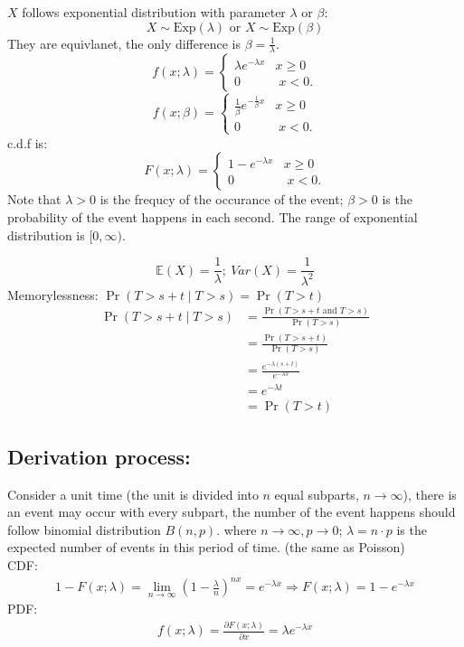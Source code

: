 \documentclass[11pt]{elegantbook}
\begin{document}
$X$ follows exponential distribution with parameter $\lambda$ or $\beta$:
$${\displaystyle X\sim {\text{Exp}}(\lambda )} \text{ or } {\displaystyle X\sim {\text{Exp}}(\beta )}$$
They are equivlanet, the only difference is $\beta=\frac{1}{\lambda}$.
$${f(x;{\lambda})=\left\{{\begin{matrix}{\lambda }e^{-{\lambda }x}&x\geq 0\\0&\;x<0.\end{matrix}}\right.}$$
$${f(x;{\beta})=\left\{{\begin{matrix}{\frac{1}{\beta} }e^{-{\frac{1}{\beta} }x}&x\geq 0\\0&\;x<0.\end{matrix}}\right.}$$
c.d.f is:
$${F(x;{\lambda})=\left\{{\begin{matrix}{1-}e^{-{\lambda }x}&x\geq 0\\0&\;x<0.\end{matrix}}\right.}$$
Note that $\lambda > 0$ is the frequcy of the occurance of the event; $\beta>0$ is the probability of the event happens in each second. The range of exponential distribution is $[0,\infty)$.

$$\mathbb{E}(X)=\frac{1}{\lambda};\ Var(X)=\frac{1}{\lambda^2}$$
Memorylessness: ${\displaystyle \Pr \left(T>s+t\mid T>s\right)=\Pr(T>t)}$
\begin{equation}
    \begin{aligned}
        \Pr (T>s+t\mid T>s)&=\frac{\Pr(T>s+t\text{ and }T>s)}{\Pr(T>s)}\\
        &=\frac{\Pr(T>s+t)}{\Pr(T>s)}\\
        &=\frac{e^{-\lambda(s+t)}}{e^{-\lambda s}}\\
        &=e^{-\lambda t}\\
        &=\Pr (T>t)
    \end{aligned}
    \nonumber
\end{equation}

\subsection*{Derivation process:}

Consider a unit time (the unit is divided into $n$ equal subparts, $n \rightarrow \infty$), there is an event may occur with every subpart, the number of the event happens should follow binomial distribution $B(n,p)$. where $n \rightarrow \infty, p \rightarrow 0$; $\lambda=n\cdot p$ is the expected number of events in this period of time. (the same as Poisson)\\
CDF:
\begin{equation}
    \begin{aligned}
        1-F(x;\lambda)=\lim_{n \rightarrow \infty}(1-\frac{\lambda}{n})^{nx}=e^{-\lambda x}
        \Rightarrow F(x;\lambda)=1-e^{-\lambda x}
    \end{aligned}
    \nonumber
\end{equation}
PDF:
\begin{equation}
    \begin{aligned}
        f(x;\lambda)=\frac{\partial F(x;\lambda)}{\partial x}=\lambda e^{-\lambda x}
    \end{aligned}
    \nonumber
\end{equation}
\end{document}
